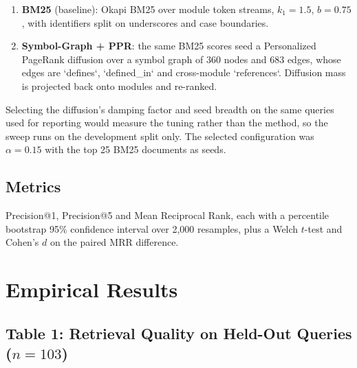 \documentclass[10pt,twocolumn,letterpaper]{article}
\begin{document}
\begin{enumerate}
  \item \textbf{BM25} (baseline): Okapi BM25 over module token streams, $k_1 = 1.5$, $b = 0.75$, with identifiers split on underscores and case boundaries.
  \item \textbf{Symbol-Graph + PPR}: the same BM25 scores seed a Personalized PageRank diffusion over a symbol graph of 360 nodes and 683 edges, whose edges are `defines`, `defined\_in` and cross-module `references`. Diffusion mass is projected back onto modules and re-ranked.
\end{enumerate}

Selecting the diffusion's damping factor and seed breadth on the same queries used for reporting would measure the tuning rather than the method, so the sweep runs on the development split only. The selected configuration was $\alpha = 0.15$ with the top 25 BM25 documents as seeds.


\subsection{Metrics}


Precision@1, Precision@5 and Mean Reciprocal Rank, each with a percentile bootstrap 95\% confidence interval over 2,000 resamples, plus a Welch $t$-test and Cohen's $d$ on the paired MRR difference.




\section{Empirical Results}



\subsection{Table 1: Retrieval Quality on Held-Out Queries ($n = 103$)}
\begin{table}[htbp]
\centering
{}
\end{table}
\end{document}
